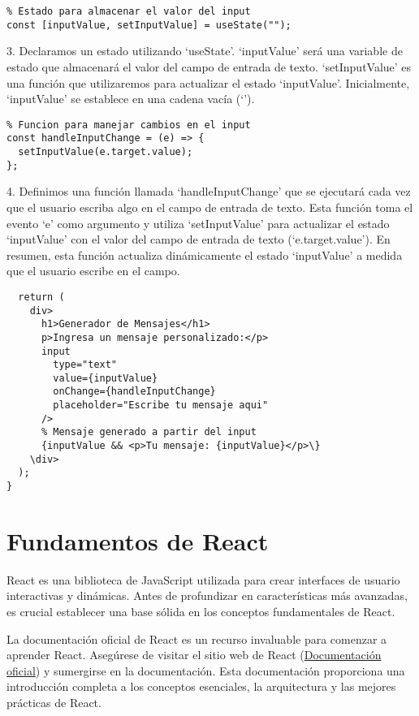 \documentclass[executivepaper]{article}
\begin{document}
\begin{lstlisting}
% Estado para almacenar el valor del input
const [inputValue, setInputValue] = useState("");
\end{lstlisting}
  
  3. Declaramos un estado utilizando \enquote*{useState}. \enquote*{inputValue} será una variable de estado que almacenará el valor del campo de entrada de texto. \enquote*{setInputValue} es una función que utilizaremos para actualizar el estado \enquote*{inputValue}. Inicialmente, \enquote*{inputValue} se establece en una cadena vacía (\enquote*{}).
  
\begin{lstlisting}
% Funcion para manejar cambios en el input
const handleInputChange = (e) => {
  setInputValue(e.target.value);
};
\end{lstlisting}
  
  4. Definimos una función llamada \enquote*{handleInputChange} que se ejecutará cada vez que el usuario escriba algo en el campo de entrada de texto. Esta función toma el evento \enquote*{e} como argumento y utiliza \enquote*{setInputValue} para actualizar el estado \enquote*{inputValue} con el valor del campo de entrada de texto (\enquote*{e.target.value}). En resumen, esta función actualiza dinámicamente el estado \enquote*{inputValue} a medida que el usuario escribe en el campo.
  
\begin{lstlisting}
  return (
    div>
      h1>Generador de Mensajes</h1>
      p>Ingresa un mensaje personalizado:</p>
      input
        type="text"
        value={inputValue}
        onChange={handleInputChange}
        placeholder="Escribe tu mensaje aqui"
      />
      % Mensaje generado a partir del input
      {inputValue && <p>Tu mensaje: {inputValue}</p>\}
    \div>
  );
}
\end{lstlisting}


\newpage
\section{Fundamentos de React}
React es una biblioteca de JavaScript utilizada para crear interfaces de usuario interactivas y dinámicas. Antes de profundizar en características más avanzadas, es crucial establecer una base sólida en los conceptos fundamentales de React.

La documentación oficial de React es un recurso invaluable para comenzar a aprender React. Asegúrese de visitar el sitio web de React (\href{https://reactjs.org/}{Documentación oficial}) y sumergirse en la documentación. Esta documentación proporciona una introducción completa a los conceptos esenciales, la arquitectura y las mejores prácticas de React.
\end{document}
